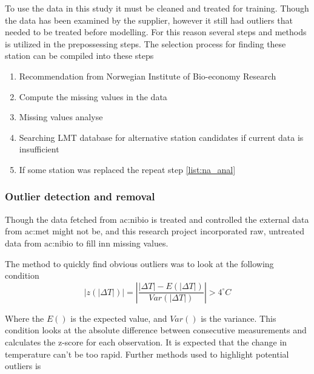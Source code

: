 To use the data in this study it must be cleaned and treated for training. Though the data has been examined by the supplier, however it still had outliers that needed to be treated before modelling. For this reason several steps and methods is utilized in the prepossessing steps. The selection process for finding these station can be compiled into these steps

\begin{enumerate}
	\item Recommendation from Norwegian Institute of Bio-economy Research
	\item \label{list:na_anal}Compute the missing values in the data
	\item Missing values analyse 
	\item Searching LMT database for alternative station candidates if current data is insufficient
	\item If some station was replaced the repeat step \ref{list:na_anal}
\end{enumerate}

\subsubsection{Outlier detection and removal}\label{sec:method:outlier}

Though the data fetched from \acrshort{ac:nibio} is treated and controlled the external data from \acrshort{ac:met} might not be, and this research project incorporated raw, untreated data from \acrshort{ac:nibio} to fill inn missing values.

The method to quickly find obvious outliers was to look at the following condition
\begin{equation}
	|z(|\Delta T|)| = \left|\frac{|\Delta T|-E(|\Delta T|)}{Var(|\Delta T|)}\right|> 4^\circ C
\end{equation}

Where the $E()$ is the expected value, and $Var()$ is the variance. This condition looks at the absolute difference between consecutive measurements and calculates the z-score for each observation. It is expected that the change in temperature can't be too rapid. Further methods used to highlight potential outliers is 


